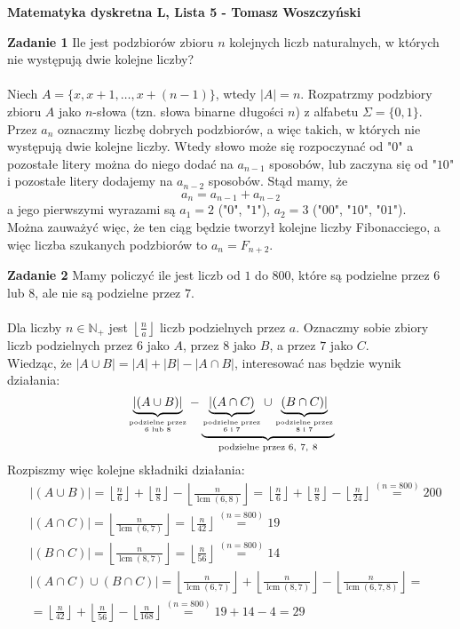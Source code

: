 \documentclass[a4paper,12pt]{article}
\newcommand{\floor}[1]{\left\lfloor #1 \right\rfloor}	%
\DeclareMathOperator{\lcm}{lcm}							%
\begin{document}
\noindent \textbf{Matematyka dyskretna L, Lista 5 - Tomasz Woszczyński}\newline

\noindent \newline \textbf{Zadanie 1} \newline
Ile jest podzbiorów zbioru $n$ kolejnych liczb naturalnych, w których nie występują dwie kolejne liczby? \\ \\
Niech $A=\{x, x + 1, \dots, x + (n - 1) \}$, wtedy $|A| = n$. Rozpatrzmy podzbiory zbioru $A$ jako $n$-słowa (tzn. słowa binarne długości $n$) z alfabetu $\Sigma=\{0, 1\}$. \\
Przez $a_n$ oznaczmy liczbę dobrych podzbiorów, a więc takich, w których nie występują dwie kolejne liczby. Wtedy słowo może się rozpoczynać od "$0$" a pozostałe litery można do niego dodać na $a_{n-1}$ sposobów, lub zaczyna się od "$10$" i pozostałe litery dodajemy na $a_{n-2}$ sposobów. Stąd mamy, że
\[ a_n = a_{n-1} + a_{n-2} \]
a jego pierwszymi wyrazami są $a_1 = 2$ ("$0$", "$1$"), $a_2 = 3$ ("$00$", "$10$", "$01$"). \\
Można zauważyć więc, że ten ciąg będzie tworzył kolejne liczby Fibonacciego, a więc liczba szukanych podzbiorów to $a_n = F_{n+2}$.

\noindent \newline \textbf{Zadanie 2} \newline
Mamy policzyć ile jest liczb od $1$ do $800$, które są podzielne przez $6$ lub $8$, ale nie są podzielne przez $7$. \\ \\
Dla liczby $n \in \mathbb{N}_+$ jest $\floor{\frac{n}{a}}$ liczb podzielnych przez $a$.  Oznaczmy sobie zbiory liczb podzielnych przez $6$ jako $A$, przez $8$ jako $B$, a przez $7$ jako $C$. \\
Wiedząc, że $|A\cup B| = |A| + |B| - |A\cap B|$, interesować nas będzie wynik działania:
\[ \underbrace{|(A \cup B)|}_{\text{podzielne przez}\atop 6 \text{ lub } 8} - \underbrace{\underbrace{|(A \cap C)}_{\text{podzielne przez}\atop 6 \text{ i } 7} \cup \underbrace{(B \cap C)|}_{\text{podzielne przez}\atop 8 \text{ i } 7}}_{\text{podzielne przez } 6,\ 7,\ 8} \]
Rozpiszmy więc kolejne składniki działania:
\begin{align*}
&|(A \cup B)| = \floor{\frac{n}{6}} + \floor{\frac{n}{8}} - \floor{\frac{n}{\lcm(6, 8)}} = \floor{\frac{n}{6}} + \floor{\frac{n}{8}} - \floor{\frac{n}{24}} \stackrel{(n=800)}{=} 200\\
&|(A \cap C)| = \floor{\frac{n}{\lcm(6, 7)}} = \floor{\frac{n}{42}} \stackrel{(n=800)}{=} 19\\
&|(B \cap C)| = \floor{\frac{n}{\lcm(8, 7)}} = \floor{\frac{n}{56}} \stackrel{(n=800)}{=} 14\\
&|(A \cap C) \cup (B \cap C)| =  \floor{\frac{n}{\lcm(6, 7)}} + \floor{\frac{n}{\lcm(8, 7)}} - \floor{\frac{n}{\lcm(6, 7, 8)}} = \\
&=\floor{\frac{n}{42}} + \floor{\frac{n}{56}} - \floor{\frac{n}{168}} \stackrel{(n=800)}{=} 19 + 14 - 4 = 29
\end{align*}
\end{document}
